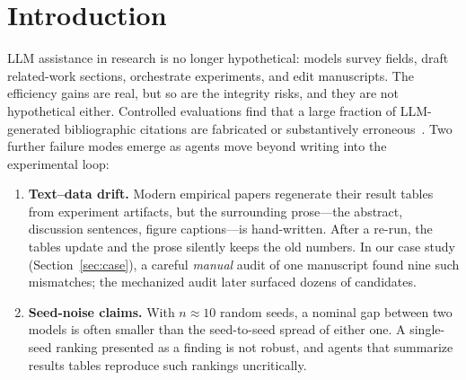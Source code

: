 \documentclass[11pt]{article}
\begin{document}
\begin{abstract}
loop. The same gates also run reviewer-side: two skills screen submitted PDFs
for references that resolve to no existing work and for numbers a paper
contradicts itself on, emitting quoted candidates that must pass human
adjudication before reaching a program chair. On a 314-paper conference
screening batch, adjudication confirmed 26 untraceable references and 15
internal inconsistencies---and cleared most raw flags as legitimate, which is
the case for making adjudication mandatory. We describe the
design, a
two-layer portability model that separates generic mechanics from per-project
configuration, and a working case study on a real multi-seed forecasting
project in which each tool produced verifiable findings, including a wrong
bibliography title, 47 stale-drift candidates in one manuscript, and a
single-seed ``best model'' headline that dissolved under paired testing.
RIGOR is available under the MIT license.
\end{abstract}

\section{Introduction}

LLM assistance in research is no longer hypothetical: models survey fields,
draft related-work sections, orchestrate experiments, and edit manuscripts.
The efficiency gains are real, but so are the integrity risks, and they are
not hypothetical either. Controlled evaluations find that a large fraction of
LLM-generated bibliographic citations are fabricated or substantively
erroneous~\cite{walters2023fabrication}. Two further failure modes emerge as
agents move beyond writing into the experimental loop:

\begin{enumerate}
\item \textbf{Text--data drift.} Modern empirical papers regenerate their
result tables from experiment artifacts, but the surrounding prose---the
abstract, discussion sentences, figure captions---is hand-written. After a
re-run, the tables update and the prose silently keeps the old numbers. In
our case study (Section~\ref{sec:case}), a careful \emph{manual} audit of one
manuscript found nine such mismatches; the mechanized audit later surfaced
dozens of candidates.
\item \textbf{Seed-noise claims.} With $n{\approx}10$ random seeds, a nominal
gap between two models is often smaller than the seed-to-seed spread of either
one. A single-seed ranking presented as a finding is not robust, and agents
that summarize results tables reproduce such rankings uncritically.
\end{enumerate}
\end{document}
